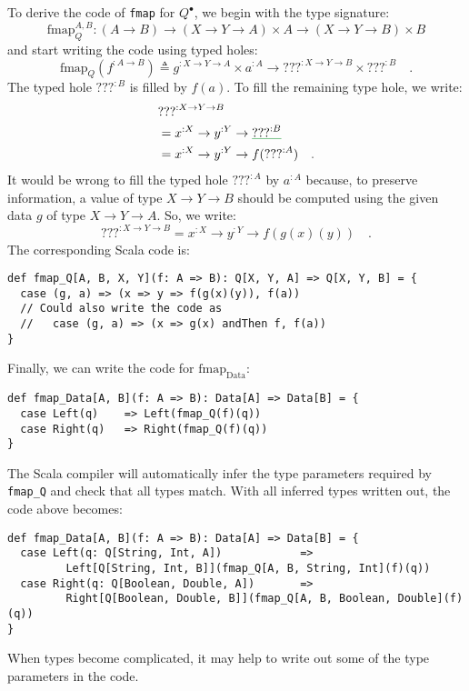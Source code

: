 To derive the code of \lstinline!fmap! for $Q^{\bullet}$, we begin
with the type signature:
\[
\text{fmap}_{Q}^{A,B}:\left(A\rightarrow B\right)\rightarrow\left(X\rightarrow Y\rightarrow A\right)\times A\rightarrow\left(X\rightarrow Y\rightarrow B\right)\times B
\]
and start writing the code using typed holes:
\[
\text{fmap}_{Q}(f^{:A\rightarrow B})\triangleq g^{:X\rightarrow Y\rightarrow A}\times a^{:A}\rightarrow\text{???}^{:X\rightarrow Y\rightarrow B}\times\text{???}^{:B}\quad.
\]
The typed hole $\text{???}^{:B}$ is filled by $f(a)$. To fill the
remaining type hole, we write:
\begin{align*}
 & \text{???}^{:X\rightarrow Y\rightarrow B}\\
 & =x^{:X}\rightarrow y^{:Y}\rightarrow\gunderline{\text{???}^{:B}}\\
 & =x^{:X}\rightarrow y^{:Y}\rightarrow f(\text{???}^{:A})\quad.
\end{align*}
It would be wrong to fill the typed hole $\text{???}^{:A}$ by $a^{:A}$
because, to preserve information, a value of type $X\rightarrow Y\rightarrow B$
should be computed using the given data $g$ of type $X\rightarrow Y\rightarrow A$.
So, we write:
\[
\text{???}^{:X\rightarrow Y\rightarrow B}=x^{:X}\rightarrow y^{:Y}\rightarrow f(g(x)(y))\quad.
\]
The corresponding Scala code is:
\begin{lstlisting}
def fmap_Q[A, B, X, Y](f: A => B): Q[X, Y, A] => Q[X, Y, B] = {
  case (g, a) => (x => y => f(g(x)(y)), f(a))
  // Could also write the code as
  //   case (g, a) => (x => g(x) andThen f, f(a))
}
\end{lstlisting}
Finally, we can write the code for $\text{fmap}_{\text{Data}}$:
\begin{lstlisting}
def fmap_Data[A, B](f: A => B): Data[A] => Data[B] = {
  case Left(q)    => Left(fmap_Q(f)(q))
  case Right(q)   => Right(fmap_Q(f)(q))
}
\end{lstlisting}
The Scala compiler will automatically infer the type parameters required
by \lstinline!fmap_Q! and check that all types match. With all inferred
types written out, the code above becomes:
\begin{lstlisting}
def fmap_Data[A, B](f: A => B): Data[A] => Data[B] = {
  case Left(q: Q[String, Int, A])            =>
         Left[Q[String, Int, B]](fmap_Q[A, B, String, Int](f)(q))
  case Right(q: Q[Boolean, Double, A])       =>
         Right[Q[Boolean, Double, B]](fmap_Q[A, B, Boolean, Double](f)(q))
}
\end{lstlisting}
When types become complicated, it may help to write out some of the
type parameters in the code.

